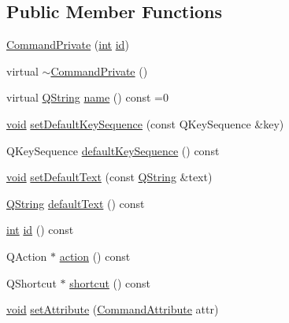 \subsection*{Public Member Functions}
\begin{DoxyCompactItemize}
\item 
\hyperlink{group___core_plugin_ga1c5b2228ffc54eaf4ce625d77f65cdc5}{Command\-Private} (\hyperlink{ioapi_8h_a787fa3cf048117ba7123753c1e74fcd6}{int} \hyperlink{glext_8h_a58c2a664503e14ffb8f21012aabff3e9}{id})
\item 
virtual \hyperlink{group___core_plugin_gabc88fac03e222720af857aced98c4a47}{$\sim$\-Command\-Private} ()
\item 
virtual \hyperlink{group___u_a_v_objects_plugin_gab9d252f49c333c94a72f97ce3105a32d}{Q\-String} \hyperlink{group___core_plugin_ga8e81a766f4f007fecaff02141fce57b0}{name} () const =0
\item 
\hyperlink{group___u_a_v_objects_plugin_ga444cf2ff3f0ecbe028adce838d373f5c}{void} \hyperlink{group___core_plugin_gac9f1ccd687f475929f102d8776232b3b}{set\-Default\-Key\-Sequence} (const Q\-Key\-Sequence \&key)
\item 
Q\-Key\-Sequence \hyperlink{group___core_plugin_ga51907026664cc58e42489c339b9eb46a}{default\-Key\-Sequence} () const 
\item 
\hyperlink{group___u_a_v_objects_plugin_ga444cf2ff3f0ecbe028adce838d373f5c}{void} \hyperlink{group___core_plugin_ga2d41122d5a7355bf8f7e7a0b67aa2d80}{set\-Default\-Text} (const \hyperlink{group___u_a_v_objects_plugin_gab9d252f49c333c94a72f97ce3105a32d}{Q\-String} \&text)
\item 
\hyperlink{group___u_a_v_objects_plugin_gab9d252f49c333c94a72f97ce3105a32d}{Q\-String} \hyperlink{group___core_plugin_ga2b2e1c3987c86e2e1f26954ccb3fdc3f}{default\-Text} () const 
\item 
\hyperlink{ioapi_8h_a787fa3cf048117ba7123753c1e74fcd6}{int} \hyperlink{group___core_plugin_gac039f1f888e5c7bd1a5d46458aeb1610}{id} () const 
\item 
Q\-Action $\ast$ \hyperlink{group___core_plugin_gad734a314cde2a62a35d6e430ddbea197}{action} () const 
\item 
Q\-Shortcut $\ast$ \hyperlink{group___core_plugin_ga84659db83eaa89893189a8bb76e5aa64}{shortcut} () const 
\item 
\hyperlink{group___u_a_v_objects_plugin_ga444cf2ff3f0ecbe028adce838d373f5c}{void} \hyperlink{group___core_plugin_ga5639adbdd06c41c271817051fa4f46cc}{set\-Attribute} (\hyperlink{group___core_plugin_ga4d899c1f711159a432afeab3eb78c917}{Command\-Attribute} attr)

\end{DoxyCompactItemize}
